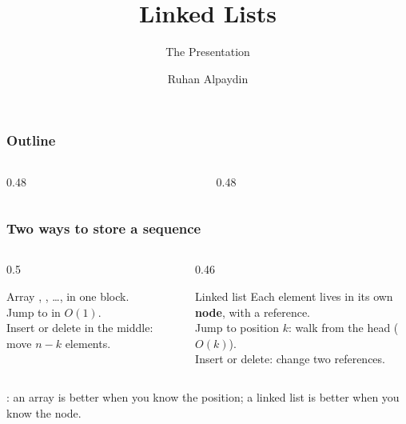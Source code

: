 \documentclass[aspectratio=169,10pt,compress]{beamer}
\title{Linked Lists}
\subtitle{The Presentation}
\author[Alpaydin]{Ruhan Alpaydin}
\institute[FCIS]{Faculty of Computer and Information Sciences\\Yeditepe University}
\date{{\tiny \hbTimeStamp}}
\begin{document}
\begin{frame}[t,fragile]
  \titlepage
\end{frame}




\begin{frame}[t,fragile] \frametitle{Outline}
  \begin{columns}[T]
    \begin{column}{0.48\textwidth}
      \tableofcontents[sections={1-5}, hideallsubsections]
    \end{column}
    \begin{column}{0.48\textwidth}
      \tableofcontents[sections={6-9}, hideallsubsections]
    \end{column}
  \end{columns}
\end{frame}





\begin{frame}[t,fragile] \frametitle{Two ways to store a sequence}
  \begin{columns}[T]
    \begin{column}{0.5\textwidth}
      \begin{block}{Array}
        \small
        , , \dots,  in one block.\\
        Jump to  in $O(1)$.\\
        Insert or delete in the middle: move $n-k$ elements.
      \end{block}
    \end{column}
    \begin{column}{0.46\textwidth}
      \begin{block}{Linked list}
        \small
        Each element lives in its own \textbf{node}, with a
         reference.\\
        Jump to position $k$: walk from the head ($O(k)$).\\
        Insert or delete: change two references.
      \end{block}
    \end{column}
  \end{columns}
  \vspace{0.4em}
  \small
  : an array is better when you know the
  position; a linked list is better when you know the node.
\end{frame}
\end{document}
